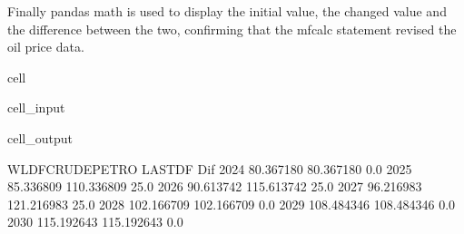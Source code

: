 \documentclass[letterpaper,10pt,english]{jupyterBook}
\begin{document}
\sphinxAtStartPar
Finally pandas math is used to display the initial value, the changed value and the difference between the two, confirming that the mfcalc statement revised the oil price data.

\begin{sphinxuseclass}{cell}\begin{sphinxVerbatimInput}

\begin{sphinxuseclass}{cell_input}
\begin{sphinxVerbatim}[commandchars=\\\{\}]

\PYG{p}{[}\PYG{p}{[}\PYG{p}{]}\PYG{p}{]}
\PYG{p}{[}\PYG{p}{]}\PYG{p}{[}\PYG{p}{[}\PYG{p}{]}\PYG{p}{]}
\PYG{p}{[}\PYG{p}{]}\PYG{p}{[}\PYG{p}{]}\PYG{p}{[}\PYG{p}{]}

\PYG{p}{[}\PYG{p}{]}
\end{sphinxVerbatim}

\end{sphinxuseclass}\end{sphinxVerbatimInput}
\begin{sphinxVerbatimOutput}

\begin{sphinxuseclass}{cell_output}
\begin{sphinxVerbatim}[commandchars=\\\{\}]
      WLDFCRUDE\PYGZus{}PETRO      LASTDF   Dif
2024        80.367180   80.367180   0.0
2025        85.336809  110.336809  25.0
2026        90.613742  115.613742  25.0
2027        96.216983  121.216983  25.0
2028       102.166709  102.166709   0.0
2029       108.484346  108.484346   0.0
2030       115.192643  115.192643   0.0
\end{sphinxVerbatim}

\end{sphinxuseclass}\end{sphinxVerbatimOutput}

\end{sphinxuseclass}
\end{document}
